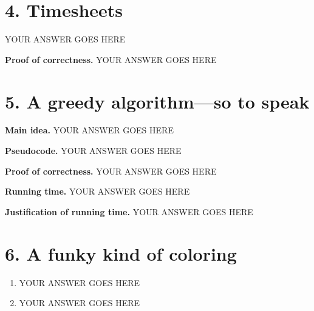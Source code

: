 \documentclass[11pt]{article}
\newenvironment{qparts}{\begin{enumerate}[{(}a{)}]}{\end{enumerate}}
\begin{document}
\newpage
\section*{4. Timesheets}

YOUR ANSWER GOES HERE


\noindent
\textbf{Proof of correctness.}
YOUR ANSWER GOES HERE


\newpage
\section*{5. A greedy algorithm---so to speak}
\noindent
\textbf{Main idea.}
YOUR ANSWER GOES HERE


\noindent
\textbf{Pseudocode.}
YOUR ANSWER GOES HERE


\noindent
\textbf{Proof of correctness.}
YOUR ANSWER GOES HERE


\noindent
\textbf{Running time.}
YOUR ANSWER GOES HERE


\noindent
\textbf{Justification of running time.}
YOUR ANSWER GOES HERE




\newpage
\section*{6. A funky kind of coloring}
\begin{qparts}
\item
YOUR ANSWER GOES HERE

\item
YOUR ANSWER GOES HERE

\end{qparts}
\end{document}
